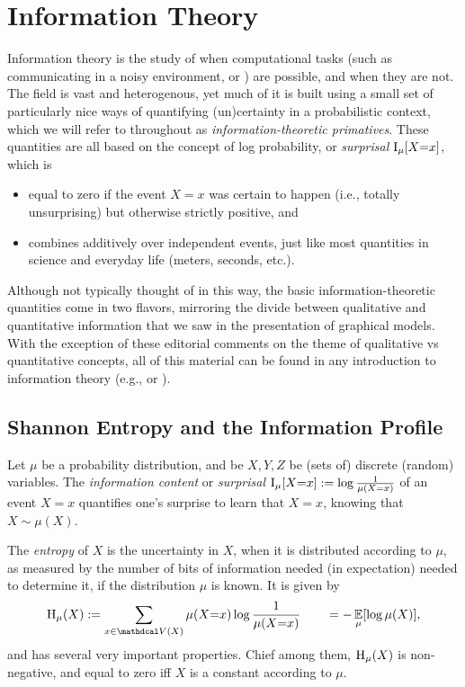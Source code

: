 \section{Information Theory}
    \label{sec:prelim-infotheory}

Information theory is the study of when computational tasks
    (such as communicating in a noisy environment, 
        or )
    are possible, and when they are not. 
%
The field is vast and heterogenous, 
    yet much of it is built using a small set of 
    particularly nice ways of quantifying (un)certainty in a probabilistic
    context, which we will refer to throughout as \emph{information-theoretic primatives}.
These quantities are all based on the concept of log probability, or \emph{surprisal} $\operatorname{\mathrm{I}}_{\mu}[ X{=}x]$, which is
\begin{itemize}[nosep]
\item equal to zero if the event $X{=}x$ was certain to happen (i.e., totally unsurprising) but otherwise strictly positive, and
\item combines additively over independent events, just like most quantities in science and everyday life (meters, seconds, etc.).
\end{itemize}


Although not typically thought of in this way, 
    the basic information-theoretic quantities come in two flavors, mirroring the divide between qualitative and quantitative information that we saw in the presentation of graphical models. 
With the exception of these editorial comments on the theme of qualitative vs quantitative concepts, all of this material can be found in any introduction to information
theory (e.g., \citet[Chapter 1]{mackay2003information} or \citet{CoverThomas}).  

\subsection{Shannon Entropy and the Information Profile}
    \label{sec:qual-info-theory-primer}

Let $\mu$ be a probability distribution, and be $X,Y,Z$
    be (sets of) discrete (random) variables.
The \emph{information content} or \emph{surprisal} $\operatorname{\mathrm{I}}_{\mu}[ X{=}x ] := \log \frac1{\mu(X{=}x)}$ of an event $X{=}x$ quantifies one's surprise to learn that $X{=}x$, knowing that $X \sim \mu(X)$.
    
The \emph{entropy} of $X$ is the uncertainty in $X$, when it is distributed according to $\mu$, as measured by the number of bits of information needed (in expectation) needed to determine it, if the distribution $\mu$ is known.  It is given by 
\[
    \H_\mu(X) := \sum_{x \in \V(X)} \mu(X{=}x) \log \frac{1}{\mu(X{=}x)} \qquad= -\Ex_{\mu}[\log \mu(X)],
\]
and has several very important properties. 
Chief among them, $\operatorname{\mathrm{H}}_\mu(X)$ is non-negative, and equal to zero iff $X$ 
    is a constant according to $\mu$. 

